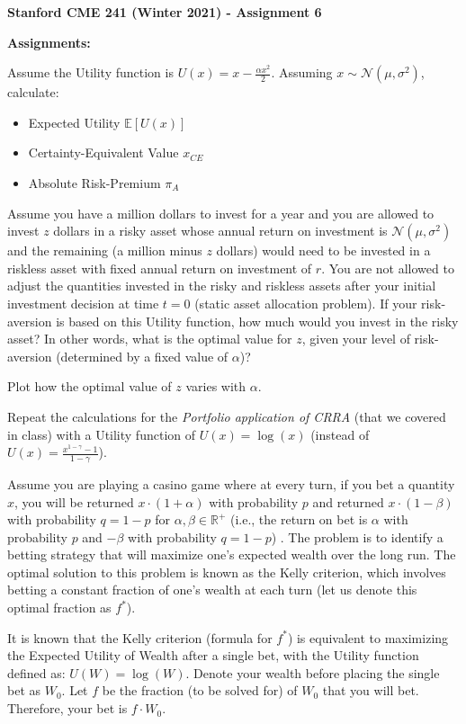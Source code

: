 \documentclass[12pt]{exam}
\begin{document}
\begin{center}
{\large {\bf Stanford CME 241 (Winter 2021) - Assignment 6}}
\end{center}
 
{\large{\bf Assignments:}}
\begin{questions}
\question Assume the Utility function is $U(x) = x - \frac {\alpha x^2} 2$. Assuming $x \sim \mathcal{N}(\mu, \sigma^2)$, calculate:
\begin{itemize}
\item Expected Utility $\mathbb{E}[U(x)]$
\item Certainty-Equivalent Value $x_{CE}$
\item Absolute Risk-Premium $\pi_A$	
\end{itemize}
Assume you have a million dollars to invest for a year and you are allowed to invest $z$ dollars in a risky asset whose annual return on investment is $\mathcal{N}(\mu, \sigma^2)$ and the remaining (a million minus $z$ dollars) would need to be invested in a riskless asset with fixed annual return on investment of $r$. You are not allowed to adjust the quantities invested in the risky and riskless assets after your initial investment decision at time $t=0$ (static asset allocation problem). If your risk-aversion is based on this Utility function, how much would you invest in the risky asset? In other words, what is the optimal value for $z$, given your level of risk-aversion (determined by a fixed value of $\alpha$)?

Plot how the optimal value of $z$ varies with $\alpha$.

\question Repeat the calculations for the {\em Portfolio application of CRRA} (that we covered in class) with a Utility function of $U(x) = \log(x)$ (instead of $U(x) = \frac {x^{1 - \gamma} - 1} {1 - \gamma}$).

\question Assume you are playing a casino game where at every turn, if you bet a quantity $x$, you will be returned $x \cdot (1 + \alpha)$ with probability $p$ and returned $x \cdot (1 - \beta)$ with probability $q = 1 - p$ for $\alpha, \beta \in \mathbb{R}^+$ (i.e., the return on bet is $\alpha$ with probability $p$ and $-\beta$ with probability $q = 1-p$) . The problem is to identify a betting strategy that will maximize one's expected wealth over the long run. The optimal solution to this problem is known as the Kelly criterion, which involves betting a constant fraction of one's wealth at each turn (let us denote this optimal fraction as $f^*$).

It is known that the Kelly criterion (formula for $f^*$) is equivalent to maximizing the Expected Utility of Wealth after a single bet, with the Utility function defined as: $U(W) = \log(W)$. Denote your wealth before placing the single bet as $W_0$. Let $f$ be the fraction (to be solved for) of $W_0$ that you will bet. Therefore, your bet is $f \cdot W_0$.


\end{questions}
\end{document}
